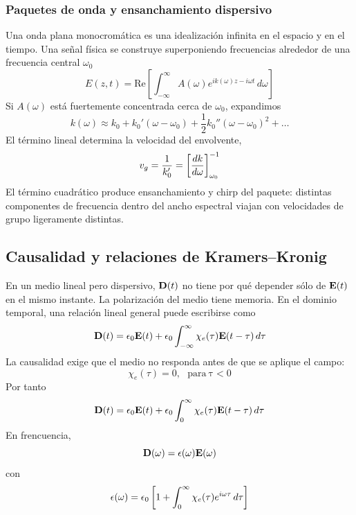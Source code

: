 \documentclass[]{article}
\numberwithin{equation}{section}
\begin{document}
\subsubsection{Paquetes de onda y ensanchamiento dispersivo}
Una onda plana monocromática es una idealización infinita en el espacio y en el tiempo. Una señal física se construye superponiendo frecuencias alrededor de una frecuencia central $\omega_0$
\begin{equation}
	E(z,t) = \mathrm{Re}\!\left[\int_{-\infty}^{\infty} A(\omega) e^{ik(\omega)z - i \omega t} \, d\omega\right]
\end{equation}
Si $A(\omega)$ está fuertemente concentrada cerca de $\omega_0$, expandimos
\begin{equation*}
	k(\omega) \approx k_0 + k_0' (\omega - \omega_0) + \frac{1}{2} k_0'' (\omega - \omega_0)^2 + \ldots
\end{equation*}
El término lineal determina la velocidad del envolvente,
\begin{equation}
	v_g = \frac{1}{k_0'} = \left[\dfrac{d k}{d \omega}\right]^{-1}_{\omega_0}
\end{equation}
El término cuadrático produce ensanchamiento y chirp del paquete: distintas componentes de frecuencia dentro del ancho espectral viajan con velocidades de grupo ligeramente distintas.

\subsection{Causalidad y relaciones de Kramers–Kronig}
En un medio lineal pero dispersivo, $\mathbf{D}(t)$ no tiene por qué depender sólo de $\mathbf{E}(t)$ en el mismo instante. La polarización del medio tiene memoria. En el dominio temporal, una relación lineal general puede escribirse como
\begin{equation}
	\mathbf{D}(t) = \epsilon_{0}\mathbf{E}(t) + \epsilon_{0}\int_{-\infty}^{\infty} \chi_e(\tau) \mathbf{E}(t - \tau) \, d\tau
\end{equation}
La causalidad exige que el medio no responda antes de que se aplique el campo:
\begin{equation}
	\chi_e(\tau) = 0, ~~~ \mathrm{para \ \tau<0}
\end{equation}
Por tanto
\begin{equation*}
	\mathbf{D}(t) = \epsilon_{0}\mathbf{E}(t) + \epsilon_{0}\int_{0}^{\infty} \chi_e(\tau) \mathbf{E}(t - \tau) \, d\tau
\end{equation*}
En frencuencia,
\begin{equation}
	\mathbf{D}(\omega) = \epsilon(\omega)\mathbf{E}(\omega)
\end{equation}
con
\begin{equation}
	\epsilon(\omega) = \epsilon_{0} \left[1 + \int_{0}^{\infty} \chi_e(\tau) e^{i\omega\tau} \, d\tau\right]
\end{equation}
\end{document}
